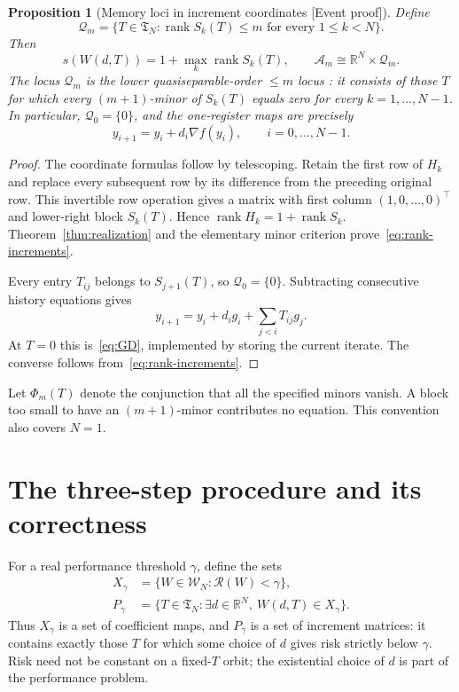 \documentclass[11pt]{article}
\newcommand{\supportlabel}[1]{\textcolor{blue!60!black}{\small\textsf{[#1]}}}
\newcommand{\eventproof}{\supportlabel{Event proof}}
\numberwithin{equation}{section}
\newtheorem{proposition}[theorem]{Proposition}
\theoremstyle{definition}
\newcommand{\R}{\mathbb R}
\newcommand{\W}{\mathcal W_N}
\newcommand{\A}{\mathcal A}
\newcommand{\Q}{\mathcal Q}
\newcommand{\risk}{\mathcal R}
\DeclareMathOperator{\rank}{rank}
\begin{document}
\begin{proposition}[Memory loci in increment coordinates \eventproof]\label{prop:loci}
Define
\begin{equation}
 \Q_m=\{T\in\mathfrak T_N:\rank S_k(T)\le m\text{ for every }1\le k<N\}.
 \label{eq:memory-locus}
\end{equation}
Then
\begin{equation}
 s(W(d,T))=1+\max_k\rank S_k(T),\qquad
 \A_m\cong\R^N\times\Q_m.
 \label{eq:rank-increments}
\end{equation}
The locus $\Q_m$ is the lower quasiseparable-order $\le m$ locus \cite{EidelmanGohberg05}: it consists of those $T$ for which every $(m+1)$-minor of $S_k(T)$ equals zero for every $k=1,\ldots,N-1$. In particular, $\Q_0=\{0\}$, and the one-register maps are precisely
\begin{equation}
 y_{i+1}=y_i+d_i\nabla f(y_i),\qquad i=0,\ldots,N-1.
 \label{eq:GD}
\end{equation}
\end{proposition}
\begin{proof}
The coordinate formulas follow by telescoping. Retain the first row of $H_k$ and replace every subsequent row by its difference from the preceding original row. This invertible row operation gives a matrix with first column $(1,0,\ldots,0)^\top$ and lower-right block $S_k(T)$. Hence $\rank H_k=1+\rank S_k$. Theorem~\ref{thm:realization} and the elementary minor criterion prove~\eqref{eq:rank-increments}.

Every entry $T_{ij}$ belongs to $S_{j+1}(T)$, so $\Q_0=\{0\}$. Subtracting consecutive history equations gives
\[
 y_{i+1}=y_i+d_ig_i+\sum_{j<i}T_{ij}g_j.
\]
At $T=0$ this is~\eqref{eq:GD}, implemented by storing the current iterate. The converse follows from~\eqref{eq:rank-increments}.
\end{proof}

Let $\Phi_m(T)$ denote the conjunction that all the specified minors vanish. A block too small to have an $(m+1)$-minor contributes no equation. This convention also covers $N=1$.

\section{The three-step procedure and its correctness}
\label{sec:procedure}
For a real performance threshold $\gamma$, define the sets
\begin{equation}
 \begin{aligned}
 X_\gamma&=\{W\in\W:\risk(W)<\gamma\},\\
 P_\gamma&=\{T\in\mathfrak T_N:\exists d\in\R^N,\ W(d,T)\in X_\gamma\}.
 \end{aligned}
 \label{eq:performance}
\end{equation}
Thus $X_\gamma$ is a set of coefficient maps, and $P_\gamma$ is a set of increment matrices: it contains exactly those $T$ for which some choice of $d$ gives risk strictly below $\gamma$. Risk need not be constant on a fixed-$T$ orbit; the existential choice of $d$ is part of the performance problem.
\end{document}
